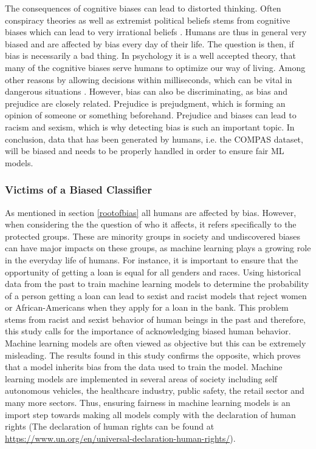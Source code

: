 \documentclass[11pt, fleqn, titlepage]{article}
\begin{document}
	The consequences of cognitive biases can lead to distorted thinking. Often conspiracy theories as well as extremist political beliefs stems from cognitive biases which can lead to very irrational beliefs \cite{cog_bias}. Humans are thus in general very biased and are affected by bias every day of their life. The question is then, if bias is necessarily a bad thing. In psychology it is a well accepted theory, that many of the cognitive biases serve humans to optimize our way of living. Among other reasons by allowing decisions within milliseconds, which can be vital in dangerous situations \cite{reisberg}. However, bias can also be discriminating, as bias and prejudice are closely related. Prejudice is prejudgment, which is forming an opinion of someone or something beforehand. Prejudice and biases can lead to racism and sexism, which is why detecting bias is such an important topic. In conclusion, data that has been generated by humans, i.e. the COMPAS dataset, will be biased and needs to be properly handled in order to ensure fair ML models.
	
	\subsubsection{Victims of a Biased Classifier}
	As mentioned in section \ref{rootofbias} all humans are affected by bias. However, when considering the the question of who it affects, it refers specifically to the protected groups. These are minority groups in society and undiscovered biases can have major impacts on these groups, as machine learning plays a growing role in the everyday life of humans. For instance, it is important to ensure that the opportunity of getting a loan is equal for all genders and races. Using historical data from the past to train machine learning models to determine the probability of a person getting a loan can lead to sexist and racist models that reject women or African-Americans when they apply for a loan in the bank. This problem stems from racist and sexist behavior of human beings in the past and therefore, this study calls for the importance of acknowledging biased human behavior. Machine learning models are often viewed as objective but this can be extremely misleading. The results found in this study confirms the opposite, which proves that a model inherits bias from the data used to train the model. Machine learning models are implemented in several areas of society including self autonomous vehicles, the healthcare industry, public safety, the retail sector and many more sectors. Thus, ensuring fairness in machine learning models is an import step towards making all models comply with the declaration of human rights (The declaration of human rights can be found at \url{https://www.un.org/en/universal-declaration-human-rights/}).
	
\end{document}
